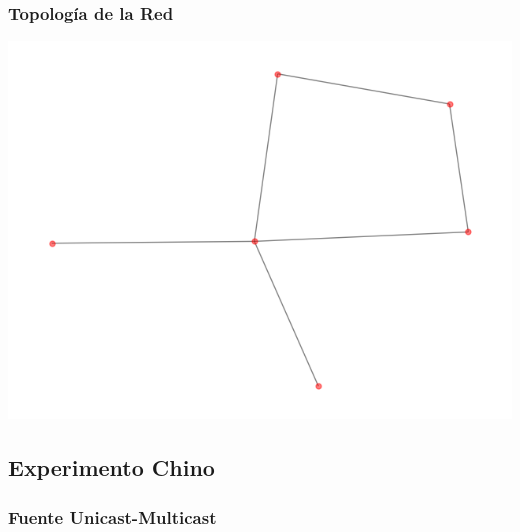 \subsubsection{Topolog\'ia de la Red}
\begin{center}
 \includegraphics[scale=0.6]{../plots/mauro_s2_topologia.png}
\end{center}

\subsection{Experimento Chino}

\subsubsection{Fuente Unicast-Multicast}

